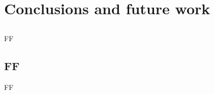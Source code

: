 \chapter{Conclusions and future work} \label{chap:conclusions-and-future-work}



\section*{}

FF



\section{FF}

FF
